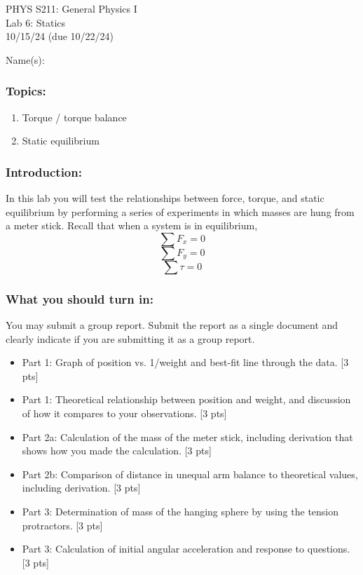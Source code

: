 \documentclass[11pt,letterpaper]{article}
\newcounter{question}[section]
\begin{document}
\setlength{\parindent}{0in}


\begin{flushright}
PHYS S211: General Physics I\\
Lab 6: Statics\\
10/15/24 (due 10/22/24)
\end{flushright}

Name(s):\\

\subsubsection*{Topics:}
\begin{enumerate}
\setlength{\parskip}{3pt}
\item Torque / torque balance
\item Static equilibrium
\end{enumerate}

\subsubsection*{Introduction:}
In this lab you will test the relationships between force, torque, and static equilibrium by performing a series of experiments in which masses are hung from a meter stick. Recall that when a system is in equilibrium,
$$\sum{F_x}=0$$
$$\sum{F_y}=0$$
$$\sum\tau=0$$

\subsubsection*{What you should turn in:} 
You may submit a group report. Submit the report as a single document and clearly indicate if you are submitting it as a group report. 

\begin{itemize}
\setlength{\parskip}{3pt}
\item Part 1: Graph of position vs. 1/weight and best-fit line through the data. [3 pts]
\item Part 1: Theoretical relationship between position and weight, and discussion of how it compares to your observations. [3 pts]
\item Part 2a: Calculation of the mass of the meter stick, including derivation that shows how you made the calculation. [3 pts]
\item Part 2b: Comparison of distance in unequal arm balance to theoretical values, including derivation. [3 pts]
\item Part 3: Determination of mass of the hanging sphere by using the tension protractors. [3 pts]
\item Part 3: Calculation of initial angular acceleration and response to questions. [3 pts]
\end{itemize}
\end{document}
